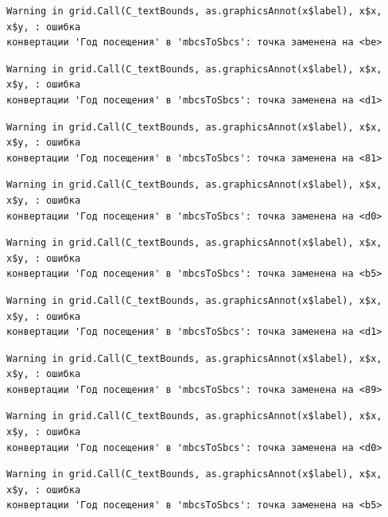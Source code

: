 \documentclass[
  letterpaper,
  DIV=11,
  numbers=noendperiod]{scrreprt}
\begin{document}
\begin{verbatim}
Warning in grid.Call(C_textBounds, as.graphicsAnnot(x$label), x$x, x$y, : ошибка
конвертации 'Год посещения' в 'mbcsToSbcs': точка заменена на <be>
\end{verbatim}

\begin{verbatim}
Warning in grid.Call(C_textBounds, as.graphicsAnnot(x$label), x$x, x$y, : ошибка
конвертации 'Год посещения' в 'mbcsToSbcs': точка заменена на <d1>
\end{verbatim}

\begin{verbatim}
Warning in grid.Call(C_textBounds, as.graphicsAnnot(x$label), x$x, x$y, : ошибка
конвертации 'Год посещения' в 'mbcsToSbcs': точка заменена на <81>
\end{verbatim}

\begin{verbatim}
Warning in grid.Call(C_textBounds, as.graphicsAnnot(x$label), x$x, x$y, : ошибка
конвертации 'Год посещения' в 'mbcsToSbcs': точка заменена на <d0>
\end{verbatim}

\begin{verbatim}
Warning in grid.Call(C_textBounds, as.graphicsAnnot(x$label), x$x, x$y, : ошибка
конвертации 'Год посещения' в 'mbcsToSbcs': точка заменена на <b5>
\end{verbatim}

\begin{verbatim}
Warning in grid.Call(C_textBounds, as.graphicsAnnot(x$label), x$x, x$y, : ошибка
конвертации 'Год посещения' в 'mbcsToSbcs': точка заменена на <d1>
\end{verbatim}

\begin{verbatim}
Warning in grid.Call(C_textBounds, as.graphicsAnnot(x$label), x$x, x$y, : ошибка
конвертации 'Год посещения' в 'mbcsToSbcs': точка заменена на <89>
\end{verbatim}

\begin{verbatim}
Warning in grid.Call(C_textBounds, as.graphicsAnnot(x$label), x$x, x$y, : ошибка
конвертации 'Год посещения' в 'mbcsToSbcs': точка заменена на <d0>
\end{verbatim}

\begin{verbatim}
Warning in grid.Call(C_textBounds, as.graphicsAnnot(x$label), x$x, x$y, : ошибка
конвертации 'Год посещения' в 'mbcsToSbcs': точка заменена на <b5>
\end{verbatim}
\end{document}
